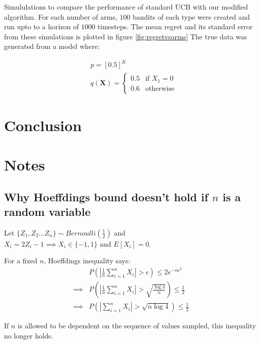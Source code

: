 \documentclass{article}
\newcommand{\eqn}[1]{\begin{align}#1\end{align}}
\newcommand{\eq}[1]{\begin{align*}#1\end{align*}}
\theoremstyle{plain}
\theoremstyle{definition}
\begin{document}
Simululations to compare the performance of standard UCB with our modified algorithm. For each number of arms, $100$ bandits of each type were created and run upto to a horizon of $1000$ timesteps. The mean regret and its standard error from these simulations is plotted in figure \ref{fig:regretvsarms} The true data was generated from a model where:

\eq{
&p = [0.5]^{K}\\
&q(\boldsymbol{X}) = \begin{cases}0.5 & \text{if $X_{1}=0$}\\ 0.6 & \text{otherwise} \end{cases}
}






\section{Conclusion}

\newpage
\section{Notes}

\subsection{Why Hoeffdings bound doesn't hold if $n$ is a random variable}

Let $\{Z_1,Z_2...Z_n\} \sim Bernoulli(\frac{1}{2}) $ and $X_i = 2Z_i-1 \implies X_i \in \{-1,1\} \text{ and } E[X_i] = 0$.

For a fixed $n$, Hoeffdings inequality says: 
\eqn{
\label{eq:HoeffdingsRandom}
& P\left(|\frac{1}{n}\sum_{i=1}^{n}X_i| > \epsilon\right) \leq 2e^{-n\epsilon^2} \\
\implies & P \left(|\frac{1}{n}\sum_{i=1}^{n}X_i| > \sqrt{\frac{\log{4}}{n}}\right) \leq \frac{1}{2} \\
\implies & P\left( |\sum_{i=1}^{n}X_i| > \sqrt{n \log{4}}\right) \leq \frac{1}{2}
}


If $n$ is allowed to be dependent on the sequence of values sampled, this inequality no longer holds. 
\end{document}
